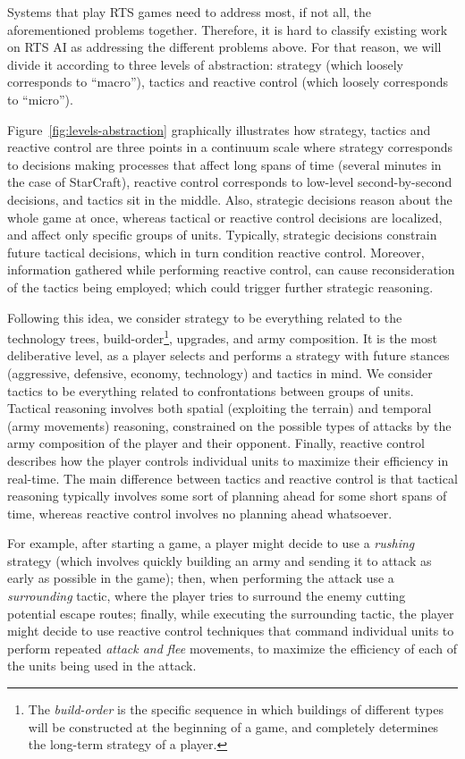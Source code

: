 \documentclass[journal]{IEEEtran}
\begin{document}
Systems that play RTS games need to address most, if not all, the aforementioned problems together. Therefore, it is hard to classify existing work on RTS AI as addressing the different problems above. For that reason, %
we will divide it according to three levels of abstraction: strategy (which loosely corresponds to ``macro''), tactics and reactive control (which loosely corresponds to ``micro''). 

Figure~\ref{fig:levels-abstraction} graphically illustrates how strategy, tactics and reactive control are three points in a continuum scale where strategy corresponds to decisions making processes that affect long spans of time (several minutes in the case of StarCraft), reactive control corresponds to low-level second-by-second decisions, and tactics sit in the middle. Also, strategic decisions reason about the whole game at once, whereas tactical or reactive control decisions are localized, and affect only specific groups of units. Typically, strategic decisions constrain future tactical decisions, which in turn condition reactive control. Moreover, information gathered while performing reactive control, can cause reconsideration of the tactics being employed; which could trigger further strategic reasoning.

Following this idea, we consider strategy to be everything related to the technology trees, build-order\footnote{The {\em build-order} is the specific sequence in which buildings of different types will be constructed at the beginning of a game, and completely determines the long-term strategy of a player.}, upgrades, and army composition. It is the most deliberative level, as a player selects and performs a strategy with future stances (aggressive, defensive, economy, technology) and tactics in mind. We consider tactics to be everything related to confrontations between groups of units. Tactical reasoning involves both spatial (exploiting the terrain) and temporal (army movements) reasoning, constrained on the possible types of attacks by the army composition of the player and their opponent. Finally, reactive control describes how the player controls individual units to maximize their efficiency in real-time. The main difference between tactics and reactive control is that tactical reasoning typically involves some sort of planning ahead for some short spans of time, whereas reactive control involves no planning ahead whatsoever.

For example, after starting a game, a player might decide to use a {\em rushing} strategy (which involves quickly building an army and sending it to attack as early as possible in the game); then, when performing the attack use a {\em surrounding} tactic, where the player tries to surround the enemy cutting potential escape routes; finally, while executing the surrounding tactic, the player might decide to use reactive control techniques that command individual units to perform repeated {\em attack and flee} movements, to maximize the efficiency of each of the units being used in the attack.
\end{document}
